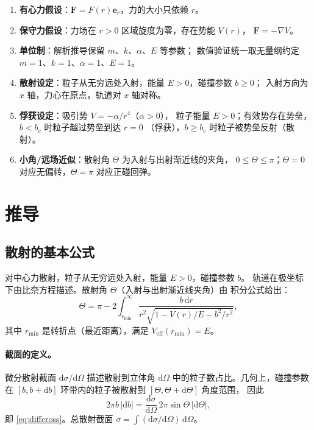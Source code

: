 \documentclass[UTF8,a4paper,11pt]{ctexart}
\begin{document}
\begin{enumerate}
  \item \textbf{有心力假设}：$\boldsymbol F=F(r)\boldsymbol e_r$，力的大小只依赖 $r$。
  \item \textbf{保守力假设}：力场在 $r>0$ 区域旋度为零，存在势能 $V(r)$，
        $\boldsymbol F=-\nabla V$。
  \item \textbf{单位制}：解析推导保留 $m$、$k$、$\alpha$、$E$ 等参数；
        数值验证统一取无量纲约定 $m=1$、$k=1$、$\alpha=1$、$E=1$。
  \item \textbf{散射设定}：粒子从无穷远处入射，能量 $E>0$，碰撞参数 $b\ge0$；
        入射方向为 $x$ 轴，力心在原点，轨道对 $x$ 轴对称。
  \item \textbf{俘获设定}：吸引势 $V=-\alpha/r^4$（$\alpha>0$），
        粒子能量 $E>0$；有效势存在势垒，$b<b_c$ 时粒子越过势垒到达 $r=0$
        （俘获），$b\ge b_c$ 时粒子被势垒反射（散射）。
  \item \textbf{小角/远场近似}：散射角 $\Theta$ 为入射与出射渐近线的夹角，
        $0\le\Theta\le\pi$；$\Theta=0$ 对应无偏转，$\Theta=\pi$ 对应正碰回弹。
\end{enumerate}

\section{推导}
\label{sec:derive}

\subsection{散射的基本公式}
\label{sub:scattering-basics}

对中心力散射，粒子从无穷远处入射，能量 $E>0$，碰撞参数 $b$。
轨道在极坐标下由比奈方程描述。散射角 $\Theta$（入射与出射渐近线夹角）由
积分公式给出：
\begin{equation}
  \Theta = \pi - 2\int_{r_{\min}}^{\infty}
  \frac{b\,\mathrm dr}{r^2\sqrt{1-V(r)/E-b^2/r^2}},
  \label{eq:scatangle}
\end{equation}
其中 $r_{\min}$ 是转折点（最近距离），满足 $V_{\mathrm{eff}}(r_{\min})=E$。

\paragraph{截面的定义。}
微分散射截面 $\mathrm d\sigma/\mathrm d\Omega$ 描述散射到立体角
$\mathrm d\Omega$ 中的粒子数占比。几何上，碰撞参数在 $[b,b+\mathrm db]$
环带内的粒子被散射到 $[\Theta,\Theta+\mathrm d\Theta]$ 角度范围，
因此
\begin{equation}
  2\pi b\,|\mathrm db| = \frac{\mathrm d\sigma}{\mathrm d\Omega}\,
  2\pi\sin\Theta\,|\mathrm d\Theta|,
\end{equation}
即 \eqref{eq:diffcross}。总散射截面 $\sigma=\int(\mathrm d\sigma/\mathrm d\Omega)\,\mathrm d\Omega$。
\end{document}
